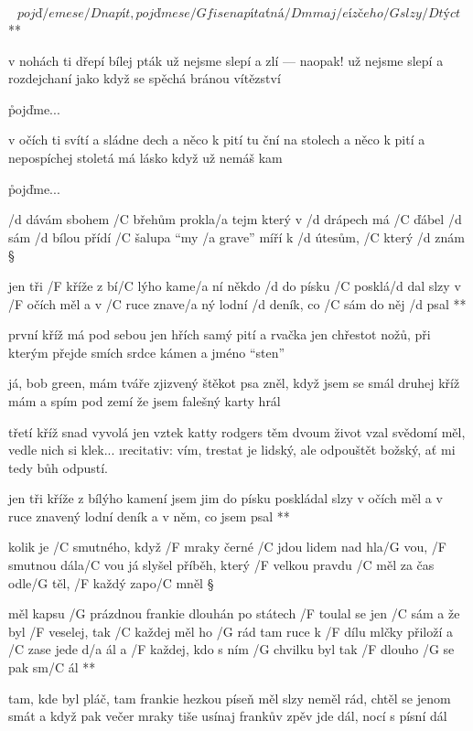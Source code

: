 \R \[ pojď/e me se /D napít, pojďme se /{G fis e} napít
   ať ná/D m maj/e í z čeho /G slzy /D týct \]**

v nohách ti dřepí bílej pták
už nejsme slepí a zlí --- naopak!
už nejsme slepí a rozdejchaní jako když se spěchá
bránou vítězství \s

\r pojďme...

v očích ti svítí a sládne dech
a něco k pití tu ční na stolech
a něco k pití a nepospíchej stoletá má lásko
když už nemáš kam \s

\r pojďme...




/d dávám sbohem /C břehům prokla/a tejm
který v /d drápech má /C ďábel /d sám
/d bílou přídí /C šalupa ``my /a grave''
míří k /d útesům, /C který /d znám \S

\R jen tři /F kříže z bí/C lýho kame/a ní
   někdo /d do písku /C posklá/d dal
   slzy v /F očích měl a v /C ruce znave/a ný
   lodní /d deník, co /C sám do něj /d psal **

první kříž má pod sebou jen hřích
samý pití a rvačka jen
chřestot nožů, při kterým přejde smích
srdce kámen a jméno ``sten'' \s

já, bob green, mám tváře zjizvený
štěkot psa zněl, když jsem se smál
druhej kříž mám a spím pod zemí
že jsem falešný karty hrál \s

třetí kříž snad vyvolá jen vztek
katty rodgers těm dvoum život vzal
svědomí měl, vedle nich si klek...
{\i recitativ:
  vím, trestat je lidský, ale odpouštět
     božský, ať mi tedy bůh odpustí.}

\R jen tři kříže z bílýho kamení
   jsem jim do písku poskládal
   slzy v očích měl a v ruce znavený
   lodní deník a v něm, co jsem psal **




kolik je /C smutného, když /F mraky černé /C jdou
lidem nad hla/G vou, /F smutnou dála/C vou
já slyšel příběh, který /F velkou pravdu /C měl
za čas odle/G těl, /F každý zapo/C mněl \S

\R měl kapsu /G prázdnou frankie dlouhán
   po státech /F toulal se jen /C sám
   a že byl /F veselej, tak /C každej měl ho /G rád
   tam ruce k /F dílu mlčky přiloží a /C zase jede d/a ál
   a /F každej, kdo s ním /G chvilku byl
   tak /F dlouho /G se pak sm/C ál **

tam, kde byl pláč, tam frankie hezkou píseň měl
slzy neměl rád, chtěl se jenom smát
a když pak večer mraky tiše usínaj
frankův zpěv jde dál, nocí s písní dál \s

